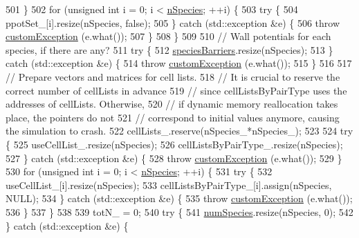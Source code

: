 \begin{DoxyCode}
501     \}
502     \textcolor{keywordflow}{for} (\textcolor{keywordtype}{unsigned} \textcolor{keywordtype}{int} i = 0; i < \hyperlink{classsim_system_ab5e2e9b6204de15520302fe1d51688dd}{nSpecies}; ++i) \{
503         \textcolor{keywordflow}{try} \{
504             ppotSet\_[i].resize(nSpecies, \textcolor{keyword}{false});
505         \} \textcolor{keywordflow}{catch} (std::exception &e) \{
506             \textcolor{keywordflow}{throw} \hyperlink{classcustom_exception}{customException} (e.what());
507         \}
508     \}
509 
510     \textcolor{comment}{// Wall potentials for each species, if there are any?}
511     \textcolor{keywordflow}{try} \{
512         \hyperlink{classsim_system_a5ae652ff4519f39c3862abae32a9581b}{speciesBarriers}.resize(nSpecies);
513     \} \textcolor{keywordflow}{catch} (std::exception &e) \{
514         \textcolor{keywordflow}{throw} \hyperlink{classcustom_exception}{customException} (e.what());
515     \}
516 
517     \textcolor{comment}{// Prepare vectors and matrices for cell lists.}
518     \textcolor{comment}{// It is crucial to reserve the correct number of cellLists in advance}
519     \textcolor{comment}{// since cellListsByPairType uses the addresses of cellLists. Otherwise,}
520     \textcolor{comment}{// if dynamic memory reallocation takes place, the pointers do not}
521     \textcolor{comment}{// correspond to initial values anymore, causing the simulation to crash.}
522     cellLists\_.reserve(nSpecies\_*nSpecies\_);
523 
524     \textcolor{keywordflow}{try} \{
525         useCellList\_.resize(nSpecies);
526         cellListsByPairType\_.resize(nSpecies);
527     \} \textcolor{keywordflow}{catch} (std::exception &e) \{
528         \textcolor{keywordflow}{throw} \hyperlink{classcustom_exception}{customException} (e.what());
529     \}
530     \textcolor{keywordflow}{for} (\textcolor{keywordtype}{unsigned} \textcolor{keywordtype}{int} i = 0; i < \hyperlink{classsim_system_ab5e2e9b6204de15520302fe1d51688dd}{nSpecies}; ++i) \{
531         \textcolor{keywordflow}{try} \{
532             useCellList\_[i].resize(nSpecies);
533             cellListsByPairType\_[i].assign(nSpecies, NULL);
534         \} \textcolor{keywordflow}{catch} (std::exception &e) \{
535             \textcolor{keywordflow}{throw} \hyperlink{classcustom_exception}{customException} (e.what());
536         \}
537     \}
538 
539     totN\_ = 0;
540         \textcolor{keywordflow}{try} \{
541         \hyperlink{classsim_system_a9eea865e6dc1cff377b1e79c4d9c23f0}{numSpecies}.resize(nSpecies, 0);
542     \} \textcolor{keywordflow}{catch} (std::exception &e) \{

\end{DoxyCode}
